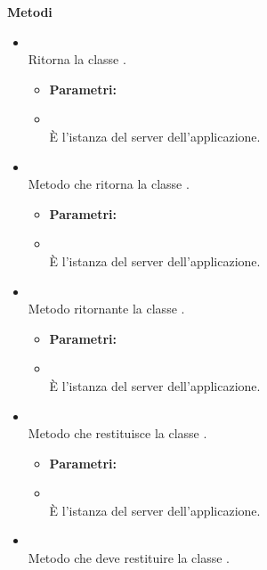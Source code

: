 		\textbf{Metodi} 
	\begin{itemize}
					\item[] \textbf{} \\ Ritorna la classe .
						\begin{itemize}\addtolength{\itemsep}{-0.5\baselineskip}
						\item[] \textbf{Parametri:}
						\item[]  \\ È l'istanza del server dell'applicazione.	
				\end{itemize}
					\item[] \textbf{} \\ Metodo che ritorna la classe .
						\begin{itemize}\addtolength{\itemsep}{-0.5\baselineskip}
						\item[] \textbf{Parametri:}
						\item[]  \\ È l'istanza del server dell'applicazione.	
				\end{itemize}
					\item[] \textbf{} \\ Metodo ritornante la classe .
						\begin{itemize}\addtolength{\itemsep}{-0.5\baselineskip}
						\item[] \textbf{Parametri:}
						\item[]  \\ È l'istanza del server dell'applicazione.	
				\end{itemize}
					\item[] \textbf{} \\ Metodo che restituisce la classe .
						\begin{itemize}\addtolength{\itemsep}{-0.5\baselineskip}
						\item[] \textbf{Parametri:}
						\item[]  \\ È l'istanza del server dell'applicazione.	
				\end{itemize}
					\item[] \textbf{} \\ Metodo che deve restituire la classe .

\end{itemize}
